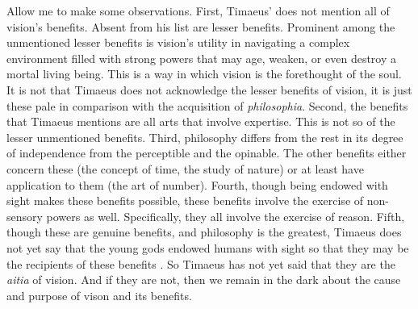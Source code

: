 Allow me to make some observations. First, Timaeus' does not mention all of vision's benefits. Absent from his list are lesser benefits. Prominent among the unmentioned lesser benefits is vision's utility in navigating a complex environment filled with strong powers that may age, weaken, or even destroy a mortal living being. This is a way in which vision is the forethought of the soul. It is not that Timaeus does not acknowledge the lesser benefits of vision, it is just these pale in comparison with the acquisition of \emph{philosophia}. Second, the benefits that Timaeus mentions are all arts that involve expertise. This is not so of the lesser unmentioned benefits. Third, philosophy differs from the rest in its degree of independence from the perceptible and the opinable. The other benefits either concern these (the concept of time, the study of nature) or at least have application to them (the art of number). Fourth, though being endowed with sight makes these benefits possible, these benefits involve the exercise of non-sensory powers as well. Specifically, they all involve the exercise of reason.  Fifth, though these are genuine benefits, and philosophy is the greatest, Timaeus does not yet say that the young gods endowed humans with sight so that they may be the recipients of these benefits \citep[107]{Johansen:2004dx}. So Timaeus has not yet said that they are the \emph{aitia} of vision. And if they are not, then we remain in the dark about the cause and purpose of vison and its benefits.

